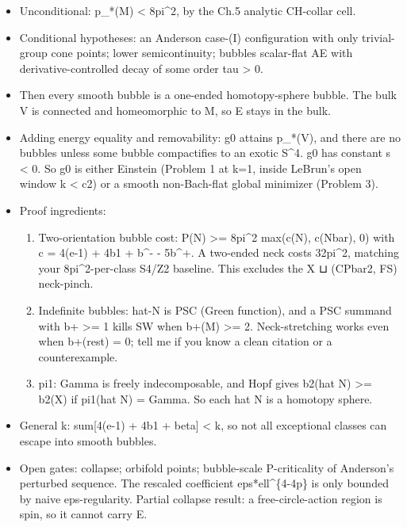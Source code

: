 \documentclass[
  10pt,
]{report}
\providecommand{\tightlist}{%
  \setlength{\itemsep}{0pt}\setlength{\parskip}{0pt}}
\begin{document}
\begin{itemize}
\tightlist
\item
  Unconditional: p\_*(M) \textless{} 8pi\^{}2, by the Ch.5 analytic
  CH-collar cell.
\item
  Conditional hypotheses: an Anderson case-(I) configuration with only
  trivial-group cone points; lower semicontinuity; bubbles scalar-flat
  AE with derivative-controlled decay of some order tau \textgreater{}
  0.
\item
  Then every smooth bubble is a one-ended homotopy-sphere bubble. The
  bulk V is connected and homeomorphic to M, so E stays in the bulk.
\item
  Adding energy equality and removability: g0 attains p\_*(V), and there
  are no bubbles unless some bubble compactifies to an exotic S\^{}4. g0
  has constant s \textless{} 0. So g0 is either Einstein (Problem 1 at
  k=1, inside LeBrun's open window k \textless{} c2) or a smooth
  non-Bach-flat global minimizer (Problem 3).
\item
  Proof ingredients:

  \begin{enumerate}
  \def\labelenumi{(\alph{enumi})}
  \tightlist
  \item
    Two-orientation bubble cost: P(N) \textgreater= 8pi\^{}2 max(c(N),
    c(Nbar), 0) with c = 4(e-1) + 4b1 + b\^{}- - 5b\^{}+. A two-ended
    neck costs 32pi\^{}2, matching your 8pi\^{}2-per-class S4/Z2
    baseline. This excludes the X ⊔ (CPbar2, FS) neck-pinch.
  \item
    Indefinite bubbles: hat-N is PSC (Green function), and a PSC summand
    with b+ \textgreater= 1 kills SW when b+(M) \textgreater= 2.
    Neck-stretching works even when b+(rest) = 0; tell me if you know a
    clean citation or a counterexample.
  \item
    pi1: Gamma is freely indecomposable, and Hopf gives b2(hat N)
    \textgreater= b2(X) if pi1(hat N) = Gamma. So each hat N is a
    homotopy sphere.
  \end{enumerate}
\item
  General k: sum{[}4(e-1) + 4b1 + beta{]} \textless{} k, so not all
  exceptional classes can escape into smooth bubbles.
\item
  Open gates: collapse; orbifold points; bubble-scale P-criticality of
  Anderson's perturbed sequence. The rescaled coefficient
  eps*ell\^{}\{4-4p\} is only bounded by naive eps-regularity. Partial
  collapse result: a free-circle-action region is spin, so it cannot
  carry E.
\end{itemize}
\end{document}
